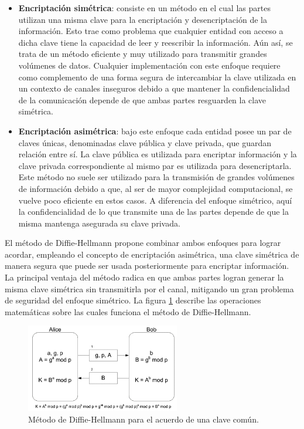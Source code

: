 \documentclass[12pt]{article}
\begin{document}
\begin{itemize}
    \item \textbf{Encriptación simétrica}: consiste en un método en el cual las partes utilizan una misma clave para la encriptación y desencriptación de la información. Esto trae como problema que cualquier entidad con acceso a dicha clave tiene la capacidad de leer y reescribir la información. Aún así, se trata de un método eficiente y muy utilizado para transmitir grandes volúmenes de datos. Cualquier implementación con este enfoque requiere como complemento de una forma segura de intercambiar la clave utilizada en un contexto de canales inseguros debido a que mantener la confidencialidad de la comunicación depende de que ambas partes resguarden la clave simétrica.
    \item \textbf{Encriptación asimétrica}: bajo este enfoque cada entidad posee un par de claves únicas, denominadas clave pública y clave privada, que guardan relación entre sí. La clave pública es utilizada para encriptar información y la clave privada correspondiente al mismo par es utilizada para desencriptarla. Este método no suele ser utilizado para la transmisión de grandes volúmenes de información debido a que, al ser de mayor complejidad computacional, se vuelve poco eficiente en estos casos. A diferencia del enfoque simétrico, aquí la confidencialidad de lo que transmite una de las partes depende de que la misma mantenga asegurada su clave privada.
\end{itemize}

El método de Diffie-Hellmann propone combinar ambos enfoques para lograr acordar, empleando el concepto de encriptación asimétrica, una clave simétrica de manera segura que puede ser usada posteriormente para encriptar información. La principal ventaja del método radica en que ambas partes logran generar la misma clave simétrica sin transmitirla por el canal, mitigando un gran problema de seguridad del enfoque simétrico. La figura \ref{fig:diffie-hellmann} describe las operaciones matemáticas sobre las cuales funciona el método de Diffie-Hellmann.
\begin{figure}[h!]
    \centering
    \includegraphics[width=0.6\textwidth]{images/diffie-hellmann.png} %
    \caption{Método de Diffie-Hellmann para el acuerdo de una clave común.}
    \label{fig:diffie-hellmann}
\end{figure}
\end{document}
